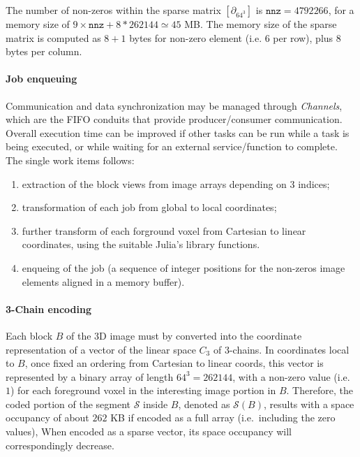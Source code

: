 The number of non-zeros within the sparse matrix $[\partial_{64^3}]$ is $\mathtt{nnz} = 4 792 266$, for a memory size of $9\times \mathtt{nnz}+8*262144 \simeq 45$ MB. The memory size of the sparse matrix is computed as $8+1$ bytes for non-zero element (i.e. 6 per row), plus 8 bytes per column.  


\paragraph{Job enqueuing} Communication and data synchronization may be managed through \emph{Channels}, which are the FIFO conduits that provide producer/consumer communication. Overall execution time can be improved if other tasks can be run while a task is being executed, or while waiting for an external service/function to complete. The single work items follows:
\begin{enumerate}

\item extraction of the block views from image arrays depending on 3 indices;

\item transformation of each job from global to local coordinates;

\item further transform of each forground voxel from Cartesian to linear coordinates, using the suitable Julia's library functions.

\item enqueing of the job (a sequence of integer positions for the non-zeros image elements aligned in a memory buffer).
\end{enumerate}

\paragraph{3-Chain encoding} 
Each block $B$ of the 3D image must by converted into the coordinate representation of a vector of the linear space $C_3$ of 3-chains. In coordinates local to $B$, once fixed an ordering from Cartesian to linear coords, this vector is represented by a binary array of length $64^3=262144$,  with a non-zero value (i.e.~$1$) for each foreground voxel in the interesting image portion in $B$. Therefore, the coded portion of the segment $\mathcal{S}$ inside $B$, denoted as $\mathcal{S}(B)$, results with a space occupancy of about $262$ KB if encoded as a full array (i.e.~including the zero values), When encoded as a sparse vector, its space occupancy will correspondingly decrease.

